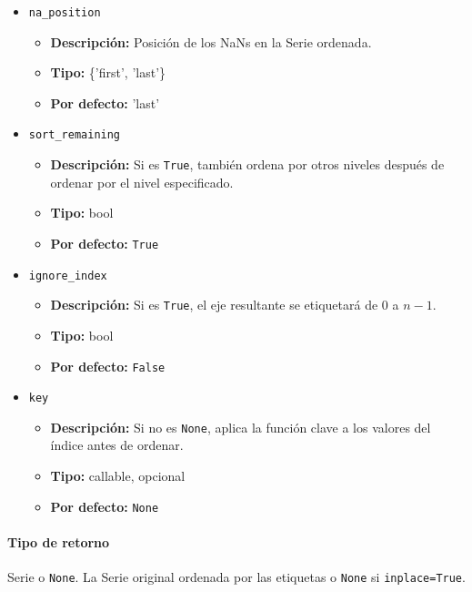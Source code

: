 \begin{itemize}
\begin{itemize}
            \end{itemize}
        \item \texttt{na\_position}
            \begin{itemize}
                \item \textbf{Descripción:} Posición de los NaNs en la Serie ordenada.
                \item \textbf{Tipo:} \{'first', 'last'\}
                \item \textbf{Por defecto:} 'last'
            \end{itemize}
        \item \texttt{sort\_remaining}
            \begin{itemize}
                \item \textbf{Descripción:} Si es \texttt{True}, también ordena por otros niveles después de ordenar por el nivel especificado.
                \item \textbf{Tipo:} bool
                \item \textbf{Por defecto:} \texttt{True}
            \end{itemize}
        \item \texttt{ignore\_index}
            \begin{itemize}
                \item \textbf{Descripción:} Si es \texttt{True}, el eje resultante se etiquetará de 0 a \( n - 1 \).
                \item \textbf{Tipo:} bool
                \item \textbf{Por defecto:} \texttt{False}
            \end{itemize}
        \item \texttt{key}
            \begin{itemize}
                \item \textbf{Descripción:} Si no es \texttt{None}, aplica la función clave a los valores del índice antes de ordenar.
                \item \textbf{Tipo:} callable, opcional
                \item \textbf{Por defecto:} \texttt{None}
            \end{itemize}
    \end{itemize}

    \paragraph{Tipo de retorno}
    Serie o \texttt{None}. La Serie original ordenada por las etiquetas o \texttt{None} si \texttt{inplace=True}.



